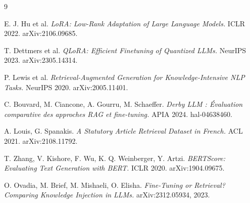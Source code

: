 \documentclass[11pt, a4paper]{article}
\begin{document}
\begin{thebibliography}{9}

E. J. Hu et al.
\textit{LoRA: Low-Rank Adaptation of Large Language Models.}
ICLR 2022. arXiv:2106.09685.

T. Dettmers et al.
\textit{QLoRA: Efficient Finetuning of Quantized LLMs.}
NeurIPS 2023. arXiv:2305.14314.

P. Lewis et al.
\textit{Retrieval-Augmented Generation for Knowledge-Intensive NLP Tasks.}
NeurIPS 2020. arXiv:2005.11401.

C. Bouvard, M. Ciancone, A. Gourru, M. Schaeffer.
\textit{Derby LLM : \'Evaluation comparative des approches RAG et fine-tuning.}
APIA 2024. hal-04638460.

A. Louis, G. Spanakis.
\textit{A Statutory Article Retrieval Dataset in French.}
ACL 2021. arXiv:2108.11792.

T. Zhang, V. Kishore, F. Wu, K. Q. Weinberger, Y. Artzi.
\textit{BERTScore: Evaluating Text Generation with BERT.}
ICLR 2020. arXiv:1904.09675.

O. Ovadia, M. Brief, M. Mishaeli, O. Elisha.
\textit{Fine-Tuning or Retrieval? Comparing Knowledge Injection in LLMs.}
arXiv:2312.05934, 2023.

\end{thebibliography}
\end{document}

